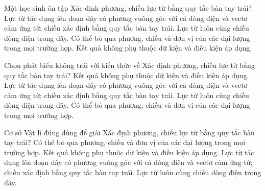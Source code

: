 \begin{ex}
Một học sinh ôn tập Xác định phương, chiều lực từ bằng quy tắc bàn tay trái?
\choice
{\True Lực từ tác dụng lên đoạn dây có phương vuông góc với cả dòng điện và vectơ cảm ứng từ; chiều xác định bằng quy tắc bàn tay trái.}
{Lực từ luôn cùng chiều dòng điện trong dây.}
{Có thể bỏ qua phương, chiều và đơn vị của các đại lượng trong mọi trường hợp.}
{Kết quả không phụ thuộc dữ kiện và điều kiện áp dụng.}
\end{ex}

\begin{ex}
Chọn phát biểu không trái với kiến thức về Xác định phương, chiều lực từ bằng quy tắc bàn tay trái?
\choice
{Kết quả không phụ thuộc dữ kiện và điều kiện áp dụng.}
{\True Lực từ tác dụng lên đoạn dây có phương vuông góc với cả dòng điện và vectơ cảm ứng từ; chiều xác định bằng quy tắc bàn tay trái.}
{Lực từ luôn cùng chiều dòng điện trong dây.}
{Có thể bỏ qua phương, chiều và đơn vị của các đại lượng trong mọi trường hợp.}
\end{ex}

\begin{ex}
Cơ sở Vật lí đúng dùng để giải Xác định phương, chiều lực từ bằng quy tắc bàn tay trái?
\choice
{Có thể bỏ qua phương, chiều và đơn vị của các đại lượng trong mọi trường hợp.}
{Kết quả không phụ thuộc dữ kiện và điều kiện áp dụng.}
{\True Lực từ tác dụng lên đoạn dây có phương vuông góc với cả dòng điện và vectơ cảm ứng từ; chiều xác định bằng quy tắc bàn tay trái.}
{Lực từ luôn cùng chiều dòng điện trong dây.}
\end{ex}

